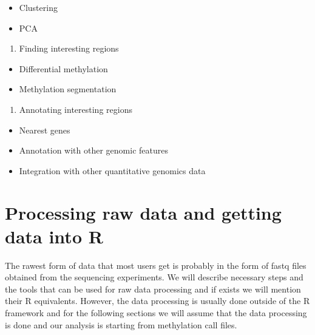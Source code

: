 \documentclass[12pt,]{krantz}
\providecommand{\tightlist}{%
  \setlength{\itemsep}{0pt}\setlength{\parskip}{0pt}}
\begin{document}
\begin{itemize}
\tightlist
\item
  Clustering
\item
  PCA
\end{itemize}

\begin{enumerate}
\def\labelenumi{\arabic{enumi}.}
\setcounter{enumi}{2}
\tightlist
\item
  Finding interesting regions
\end{enumerate}

\begin{itemize}
\tightlist
\item
  Differential methylation
\item
  Methylation segmentation
\end{itemize}

\begin{enumerate}
\def\labelenumi{\arabic{enumi}.}
\setcounter{enumi}{3}
\tightlist
\item
  Annotating interesting regions
\end{enumerate}

\begin{itemize}
\tightlist
\item
  Nearest genes
\item
  Annotation with other genomic features
\item
  Integration with other quantitative genomics data
\end{itemize}

\hypertarget{processing-raw-data-and-getting-data-into-r}{%
\section{Processing raw data and getting data into R}\label{processing-raw-data-and-getting-data-into-r}}

The rawest form of data that most users get is probably in the form of fastq files obtained from the sequencing experiments. We will describe necessary steps and the tools that can be used for raw data processing and if exists we will mention their R equivalents. However, the data processing is usually done outside of the R framework and for the following sections we will assume that the data processing is done and our analysis is starting from methylation call files.
\end{document}
